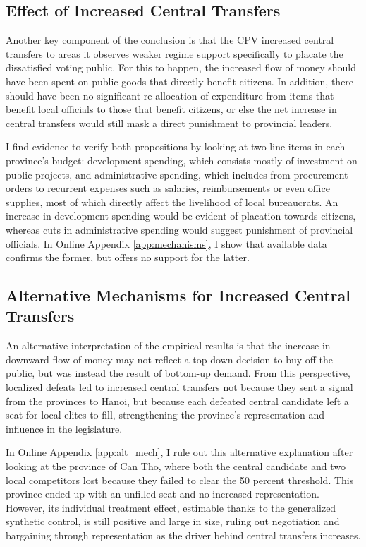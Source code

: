 \documentclass[12pt]{article}
\newcommand{\1}{\mathbbm{1}}
\begin{document}
\subsection{Effect of Increased Central Transfers}

Another key component of the conclusion is that the CPV increased central transfers to areas it observes weaker regime support specifically to placate the dissatisfied voting public. For this to happen, the increased flow of money should have been spent on public goods that directly benefit citizens. In addition, there should have been no significant re-allocation of expenditure from items that benefit local officials to those that benefit citizens, or else the net increase in central transfers would still mask a direct punishment to provincial leaders. 

I find evidence to verify both propositions by looking at two line items in each province's budget: development spending, which consists mostly of investment on public projects, and administrative spending, which includes from procurement orders to recurrent expenses such as salaries, reimbursements or even office supplies, most of which directly affect the livelihood of local bureaucrats. An increase in development spending would be evident of placation towards citizens, whereas cuts in administrative spending would suggest punishment of provincial officials. In Online Appendix \ref{app:mechanisms}, I show that available data confirms the former, but offers no support for the latter.

\subsection{Alternative Mechanisms for Increased Central Transfers}

An alternative interpretation of the empirical results is that the increase in downward flow of money may not reflect a top-down decision to buy off the public, but was instead the result of bottom-up demand. From this perspective, localized defeats led to increased central transfers not because they sent a signal from the provinces to Hanoi, but because each defeated central candidate left a seat for local elites to fill, strengthening the province's representation and influence in the legislature. 

In Online Appendix \ref{app:alt_mech}, I rule out this alternative explanation after looking at the province of Can Tho, where both the central candidate and two local competitors lost because they failed to clear the 50 percent threshold. This province ended up with an unfilled seat and no increased representation. However, its individual treatment effect, estimable thanks to the generalized synthetic control, is still positive and large in size, ruling out negotiation and bargaining through representation as the driver behind central transfers increases.
\end{document}
